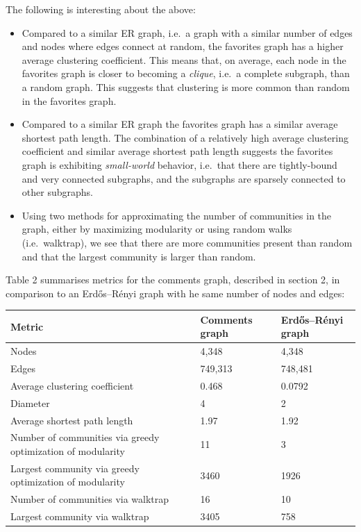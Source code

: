 The following is interesting about the above:

\begin{itemize}
\item
  Compared to a similar ER graph, i.e.~a graph with a similar number of
  edges and nodes where edges connect at random, the favorites graph has
  a higher average clustering coefficient. This means that, on average,
  each node in the favorites graph is closer to becoming a
  \emph{clique}, i.e.~a complete subgraph, than a random graph. This
  suggests that clustering is more common than random in the favorites
  graph.
\item
  Compared to a similar ER graph the favorites graph has a similar
  average shortest path length. The combination of a relatively high
  average clustering coefficient and similar average shortest path
  length suggests the favorites graph is exhibiting \emph{small-world}
  behavior, i.e.~that there are tightly-bound and very connected
  subgraphs, and the subgraphs are sparsely connected to other
  subgraphs.
\item
  Using two methods for approximating the number of communities in the
  graph, either by maximizing modularity or using random walks
  (i.e.~walktrap), we see that there are more communities present than
  random and that the largest community is larger than random.
\end{itemize}

Table 2 summarises metrics for the comments graph, described in section
2, in comparison to an Erdős--Rényi graph with he same number of nodes
and edges:

\begin{tabular}{|l|l|l|}\hline
Metric & Comments graph & Erdős–Rényi graph \\ \hline
Nodes  & 4,348 & 4,348 \\
Edges  & 749,313 & 748,481 \\
Average clustering coefficient & 0.468 & 0.0792 \\
Diameter & 4 & 2 \\
Average shortest path length & 1.97 & 1.92 \\
Number of communities via greedy optimization of modularity & 11 & 3 \\
Largest community via greedy optimization of modularity & 3460 & 1926 \\
Number of communities via walktrap & 16 & 10 \\
Largest community via walktrap & 3405 & 758 \\
\end{tabular}

